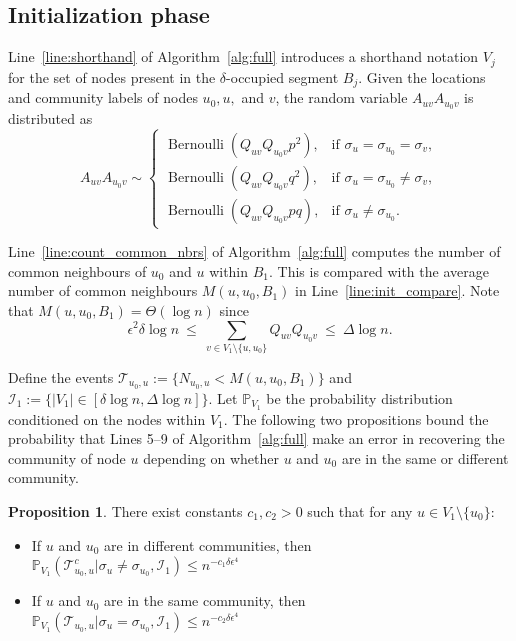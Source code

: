 \documentclass[letterpaper,11pt]{article}
\newtheorem{prop}[thm]{Proposition}
\theoremstyle{definition}
\def\P{\mathbb{P}}
\def\cI{\mathcal{I}}
\def\cT{\mathcal{T}}
\def\wle{ \ \le \ }
\newcommand{\Bern}{\operatorname{Bernoulli}}
\numberwithin{equation}{section}
\newcommand{\eps}{\epsilon}
\newtheorem{prop}[thm]{Proposition}
\theoremstyle{definition}
\def\P{\mathbb{P}}
\def\cI{\mathcal{I}}
\def\cT{\mathcal{T}}
\def\wle{ \ \le \ }
\newcommand{\Bern}{\operatorname{Bernoulli}}
\numberwithin{equation}{section}
\newcommand{\eps}{\epsilon}
\theoremstyle{thmstyletwo}%
\begin{document}
\subsection{Initialization phase}
Line~\ref{line:shorthand} of Algorithm~\ref{alg:full} introduces a shorthand notation $V_j$ for the set of nodes present in the $\delta$-occupied segment $B_j$. Given the locations and community labels of nodes $u_0,u,$ and $v$, the random variable $A_{uv}A_{u_0v}$ is distributed as 
\begin{equation}
A_{uv}A_{u_0v} \sim \begin{cases}
\Bern\left(Q_{uv}Q_{u_0v}p^2\right), & \text{if } \sigma_u = \sigma_{u_0}=\sigma_v, \\
\Bern\left(Q_{uv}Q_{u_0v}q^2\right), & \text{if } \sigma_u = \sigma_{u_0}\ne\sigma_v, \\
\Bern\left(Q_{uv}Q_{u_0v}pq\right),  & \text{if } \sigma_u \ne \sigma_{u_0}.
\end{cases}
\label{eq:dist_comm_nbrs}
\end{equation}

Line~\ref{line:count_common_nbrs} of Algorithm~\ref{alg:full} computes the number of common neighbours of $u_0$ and $u$ within $B_1$. This is compared with the average number of common neighbours $M(u,u_0,B_1)$ in Line~\ref{line:init_compare}. Note that $M(u,u_0,B_1) =\Theta(\log n)$ since
\begin{equation}
\eps^2 \delta \log n 
\wle 
\sum_{v\in V_1\setminus \{u,u_0\}} Q_{uv}Q_{u_0v}
\wle  \Delta \log n.
\label{eq:M_theta_logn}
\end{equation}

Define the events $\cT_{u_0,u} := \{N_{u_0,u}< M(u,u_0,B_1)\}$ and $\cI_1 := \{|V_1| \in [\delta \log n,\Delta \log n]\}$. Let $\P_{V_1}$ be the probability distribution conditioned on the nodes within $V_1$. The following two propositions bound the probability that Lines 5--9 of Algorithm~\ref{alg:full} make an error in recovering the community of node $u$ depending on whether $u$ and $u_0$ are in the same or different community. 

\begin{prop}
There exist constants $c_1,c_2>0$ such that
for any $u\in V_1 \setminus \{u_0\}$:
\begin{itemize}
\item[(a)] If $u$ and $u_0$ are in different communities, then $\P_{V_1}(\cT_{u_0,u}^c|\sigma_u\ne\sigma_{u_0},\cI_1) \le n^{-c_1\delta \eps^4}$
\item[(b)] If $u$ and $u_0$ are in the same community, then $\P_{V_1}(\cT_{u_0,u}|\sigma_u = \sigma_{u_0},\cI_1) \le n^{-c_2 \delta \eps^4}$
\end{itemize}
\label{prop:type2}
\end{prop}
\end{document}

